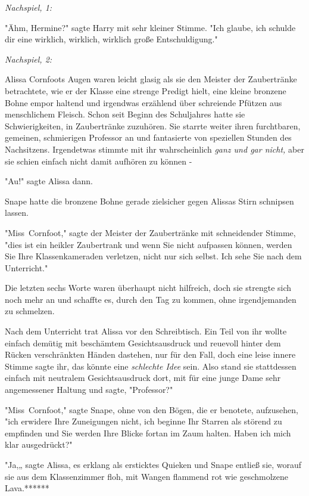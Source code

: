 {\later

\emph{Nachspiel, 1:}

"Ähm, Hermine?" sagte Harry mit sehr kleiner Stimme. "Ich glaube, ich schulde dir eine wirklich, wirklich, wirklich große Entschuldigung."

\later

\emph{Nachspiel, 2:}

Alissa Cornfoots Augen waren leicht glasig als sie den Meister der Zaubertränke betrachtete, wie er der Klasse eine strenge Predigt hielt, eine kleine bronzene Bohne empor haltend und irgendwas erzählend über schreiende Pfützen aus menschlichem Fleisch. Schon seit Beginn des Schuljahres hatte sie Schwierigkeiten, in Zaubertränke zuzuhören. Sie starrte weiter ihren furchtbaren, gemeinen, schmierigen Professor an und fantasierte von speziellen Stunden des Nachsitzens. Irgendetwas stimmte mit ihr wahrscheinlich \emph{ganz und gar nicht,} aber sie schien einfach nicht damit aufhören zu können -

"Au!" sagte Alissa dann.

Snape hatte die bronzene Bohne gerade zielsicher gegen Alissas Stirn schnipsen lassen.

"Miss~Cornfoot," sagte der Meister der Zaubertränke mit schneidender Stimme, "dies ist ein heikler Zaubertrank und wenn Sie nicht aufpassen können, werden Sie Ihre Klassenkameraden verletzen, nicht nur sich selbst. Ich sehe Sie nach dem Unterricht."

Die letzten sechs Worte waren überhaupt nicht hilfreich, doch sie strengte sich noch mehr an und schaffte es, durch den Tag zu kommen, ohne irgendjemanden zu schmelzen.

Nach dem Unterricht trat Alissa vor den Schreibtisch. Ein Teil von ihr wollte einfach demütig mit beschämtem Gesichtsausdruck und reuevoll hinter dem Rücken verschränkten Händen dastehen, nur für den Fall, doch eine leise innere Stimme sagte ihr, das könnte eine \emph{schlechte Idee} sein. Also stand sie stattdessen einfach mit neutralem Gesichtsausdruck dort, mit für eine junge Dame sehr angemessener Haltung und sagte, "Professor?"

"Miss~Cornfoot," sagte Snape, ohne von den Bögen, die er benotete, aufzusehen, "ich erwidere Ihre Zuneigungen nicht, ich beginne Ihr Starren als störend zu empfinden und Sie werden Ihre Blicke fortan im Zaum halten. Haben ich mich klar ausgedrückt?"

"Ja,„ sagte Alissa, es erklang als ersticktes Quieken und Snape entließ sie, worauf sie aus dem Klassenzimmer floh, mit Wangen flammend rot wie geschmolzene Lava.******

}
